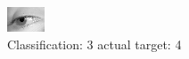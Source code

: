 \begin{figure}[h!]
\begin{center}
\includegraphics[width=0.60\columnwidth]{figures/ID2928_class_3_target_4.png}
\end{center}
\caption{ Classification: 3 actual target: 4}
\label{fig:ID2928_class_3_target_4}
\end{figure}
